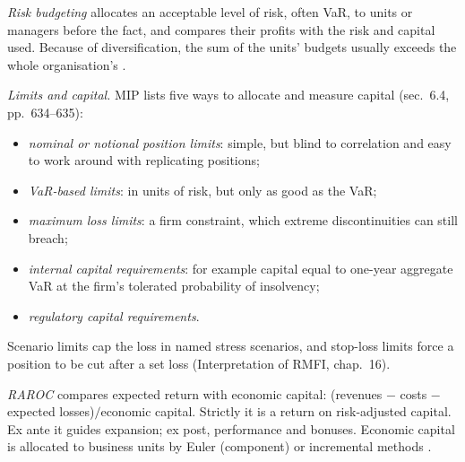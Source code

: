 \begin{qfmethod}\label{meth:market-risk-limits-capital}
 \emph{Risk budgeting} allocates an acceptable level of risk, often VaR, to units or managers before the fact, and compares their profits with the risk and capital used. Because of diversification, the sum of the units' budgets usually exceeds the whole organisation's \citep[chap.~9, sec.~6.1.1, pp.~626--628]{managing-investment-portfolios-2007}.

\emph{Limits and capital.} MIP lists five ways to allocate and measure capital (sec.~6.4, pp.~634--635):
\begin{itemize}
\item \emph{nominal or notional position limits}: simple, but blind to correlation and easy to work around with replicating positions;
\item \emph{VaR-based limits}: in units of risk, but only as good as the VaR;
\item \emph{maximum loss limits}: a firm constraint, which extreme discontinuities can still breach;
\item \emph{internal capital requirements}: for example capital equal to one-year aggregate VaR at the firm's tolerated probability of insolvency;
\item \emph{regulatory capital requirements}.
\end{itemize}
Scenario limits cap the loss in named stress scenarios, and stop-loss limits force a position to be cut after a set loss (Interpretation of RMFI, chap.~16).

\emph{RAROC} compares expected return with economic capital: (revenues $-$ costs $-$ expected losses)$/$economic capital. Strictly it is a return on risk-adjusted capital. Ex ante it guides expansion; ex post, performance and bonuses. Economic capital is allocated to business units by Euler (component) or incremental methods \citep[chap.~28, pp.~609--613]{risk-management-financial-institutions-2023}.


\end{qfmethod}

